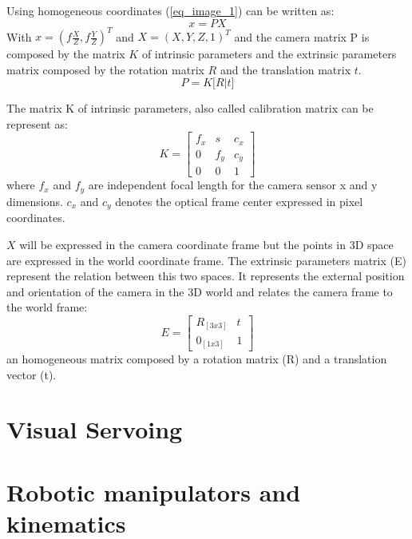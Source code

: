 Using homogeneous coordinates (\ref{eq_image_1}) can be written as:
\begin{equation}
   x = PX
\end{equation}
With $ x = (f \frac{X}{Z},f \frac{Y}{Z})^T $ and $ X = (X, Y, Z, 1)^T$ and the camera matrix P is composed by the matrix $K$ of intrinsic parameters and the extrinsic parameters matrix composed by the rotation matrix $R$ and the translation matrix $t$.
\begin{equation}
   P = K \big[ R|t \big]
\end{equation}

The matrix K of intrinsic parameters, also called calibration matrix can be represent as:
\[
K 
=
\begin{bmatrix}
    f_{x} & s & c_{x} \\
    0 & f_{y} & c_{y}\\
    0 & 0 & 1
\end{bmatrix}
\]
where $f_{x}$ and $f_{y}$ are independent focal length for the camera sensor x and y dimensions. $c_{x}$ and $c_{y}$ denotes the optical frame center expressed in pixel coordinates.

$X$ will be expressed in the camera coordinate frame but the points in 3D space are expressed in the world coordinate frame. The extrinsic parameters matrix (E)  represent the relation between this two spaces. It represents the external position and orientation of the camera in the 3D world and relates the camera frame to the world frame:
\[
E
=
\begin{bmatrix}
    R_{[3x3]} & t \\
    0_{[1x3]} & 1
\end{bmatrix}
\]
an homogeneous matrix composed by a rotation matrix (R) and a translation vector (t).



\section{Visual Servoing}
\label{Visual_Servoing}

\section{Robotic manipulators and kinematics}
\label{Robotic_manipulator}


